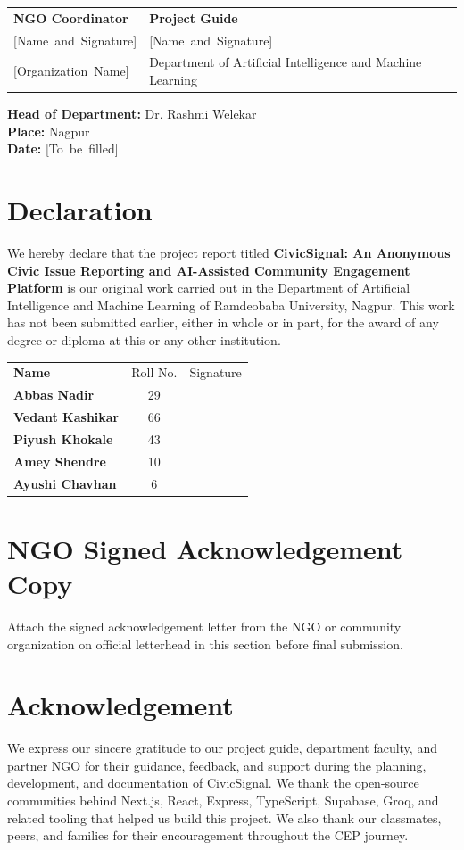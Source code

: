 \documentclass[12pt,a4paper]{report}
\newcommand{\projecttitle}{CivicSignal: An Anonymous Civic Issue Reporting and AI-Assisted Community Engagement Platform}
\newcommand{\departmentname}{Department of Artificial Intelligence and Machine Learning}
\newcommand{\institutionname}{Ramdeobaba University, Nagpur}
\begin{document}
\vspace{1.5cm}
\begin{tabular}{p{6cm}p{6cm}}
  \textbf{NGO Coordinator} & \textbf{Project Guide} \\
  \mbox{[Name and Signature]} & \mbox{[Name and Signature]} \\
  \mbox{[Organization Name]} & \departmentname \\
\end{tabular}

\vspace{1.5cm}
\noindent\textbf{Head of Department:} Dr. Rashmi Welekar \\
\textbf{Place:} Nagpur \\
\textbf{Date:} \mbox{[To be filled]}

\chapter*{Declaration}
We hereby declare that the project report titled \textbf{\projecttitle} is our original work carried out in the \departmentname{} of \institutionname. This work has not been submitted earlier, either in whole or in part, for the award of any degree or diploma at this or any other institution.

\vspace{1.2cm}
\begin{tabularx}{\textwidth}{>{\bfseries}XcX}
  Name & Roll No. & Signature \\
  Abbas Nadir & 29 & \\
  Vedant Kashikar & 66 & \\
  Piyush Khokale & 43 & \\
  Amey Shendre & 10 & \\
  Ayushi Chavhan & 6 & \\
\end{tabularx}

\chapter*{NGO Signed Acknowledgement Copy}
Attach the signed acknowledgement letter from the NGO or community organization on official letterhead in this section before final submission.

\chapter*{Acknowledgement}
We express our sincere gratitude to our project guide, department faculty, and partner NGO for their guidance, feedback, and support during the planning, development, and documentation of CivicSignal. We thank the open-source communities behind Next.js, React, Express, TypeScript, Supabase, Groq, and related tooling that helped us build this project. We also thank our classmates, peers, and families for their encouragement throughout the CEP journey.
\end{document}
